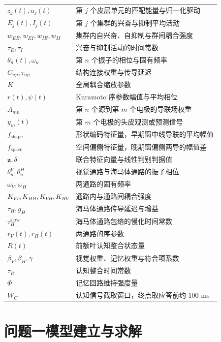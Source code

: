 \documentclass[bwprint]{gmcmthesis}
\begin{document}
\begin{longtable}{|P{2.6cm}|>{\raggedright\arraybackslash}p{\textwidth-2.6cm-4\arrayrulewidth\relax}|}
  $z_j(t), u_j(t)$ & 第 $j$ 个皮层单元的匹配能量与归一化驱动 \\
  $E_j(t), I_j(t)$ & 第 $j$ 个集群的兴奋与抑制平均活动 \\
  $w_{EE}, w_{EI}, w_{IE}, w_{II}$ & 集群内自兴奋、自抑制与群间耦合强度 \\
  $\tau_E, \tau_I$ & 兴奋与抑制活动的时间常数 \\
  $\theta_n(t), \omega_n$ & 第 $n$ 个振子的相位与固有频率 \\
  $C_{np}, \tau_{np}$ & 结构连接权重与传导延迟 \\
  $K$ & 全局耦合缩放参数 \\
  $r(t), \psi(t)$ & Kuramoto 序参数幅值与平均相位 \\
  $A_{mn}$ & 第 $n$ 个源到第 $m$ 个电极的导联场权重 \\
  $y_m(t)$ & 第 $m$ 个电极的头皮观测或预测信号 \\
  $f_{\mathrm{shape}}$ & 形状编码特征量，早期窗中线导联的平均幅值 \\
  $f_{\mathrm{space}}$ & 空间偏侧特征量，晚期窗偏侧两导的幅值差 \\
  $\mathbf{z}, \delta$ & 联合特征向量与线性判别判据值 \\
  $\theta_n^{V}, \theta_n^{H}$ & 视觉通路与海马体通路的振子相位 \\
  $\omega_V, \omega_H$ & 两通路的固有频率 \\
  $K_{VV}, K_{HH}, K_{VH}, K_{HV}$ & 通路内与通路间耦合强度 \\
  $\tau_H, g_H$ & 海马体通路传导延迟与增益 \\
  $\tau_H^{\mathrm{slow}}$ & 海马体通路包络的慢化时间常数 \\
  $r_V(t), r_H(t)$ & 两通路的序参数 \\
  $R(t)$ & 前额叶认知整合状态量 \\
  $\beta_V, \beta_H, \gamma$ & 视觉权重、记忆权重与符合项系数 \\
  $\tau_R$ & 认知整合时间常数 \\
  $\Phi$ & 记忆回路维持强度量 \\
  $W_C$ & 认知信号截取窗口，终点取应答前约 $100$ ms \\
  \hline
\end{longtable}
\setcounter{table}{\value{huaweisymbolsavetable}}

\section{问题一模型建立与求解}
\end{document}
